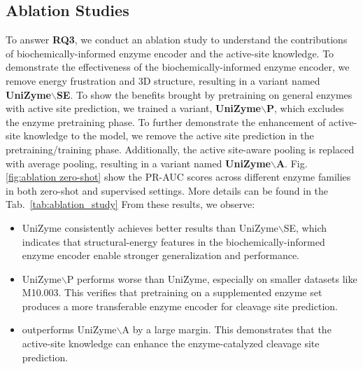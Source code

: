 \subsection{Ablation Studies}
To answer \textbf{RQ3}, we conduct an ablation study to understand the contributions of biochemically-informed enzyme encoder and the active-site knowledge. To demonstrate the effectiveness of the biochemically-informed enzyme encoder, we remove energy frustration and 3D structure, resulting in a variant named \textbf{ UniZyme$\backslash$SE}. To show the benefits brought by pretraining on general enzymes with active site prediction, we trained a variant, \textbf{UniZyme$\backslash$P}, which excludes the enzyme pretraining phase. To further demonstrate the enhancement of active-site knowledge to the model, we remove the active site prediction in the pretraining/training phase. Additionally, the active site-aware pooling is replaced with average pooling, resulting in a variant named \textbf{UniZyme$\backslash$A}. Fig.  \ref{fig:ablation zero-shot} show the PR-AUC scores across different enzyme families in both zero-shot and supervised settings. More details can be found in the Tab.~\ref{tab:ablation_study} From these results, we observe:
\begin{itemize}[leftmargin=*]
    \item {UniZyme} consistently achieves better results than UniZyme$\backslash$SE, which indicates that structural-energy features in the biochemically-informed enzyme encoder enable stronger generalization and performance.
    \item {UniZyme$\backslash$P} performs worse than {UniZyme}, especially on smaller datasets like M10.003. This verifies that pretraining on a supplemented enzyme set produces a more transferable enzyme encoder for cleavage site prediction.
    \item {\method} outperforms {UniZyme$\backslash$A} by a large margin. This demonstrates that the active-site knowledge can enhance the enzyme-catalyzed cleavage site prediction. 
\end{itemize}



